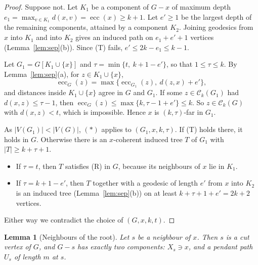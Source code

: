 \documentclass[11pt,a4paper]{article}
\newtheorem{lemma}[theorem]{Lemma}
\theoremstyle{definition}
\newcommand{\ecc}{\operatorname{ecc}}
\newcommand{\C}{\mathcal{C}}
\begin{document}
\begin{proof}
Suppose not. Let $K_1$ be a component of $G-x$ of maximum depth $e_1=\max_{v\in K_1}d(x,v)=\ecc(x)\ge k+1$. Let $e'\ge1$ be the largest depth of the remaining components, attained by a component $K_2$. Joining geodesics from $x$ into $K_1$ and into $K_2$ gives an induced path on $e_1+e'+1$ vertices (Lemma~\ref{lem:sep}(b)). Since (T) fails, $e'\le 2k-e_1\le k-1$.

Let $G_1=G[K_1\cup\{x\}]$ and $\tau=\min\{t,\ k+1-e'\}$, so that $1\le\tau\le k$. By Lemma~\ref{lem:sep}(a), for $z\in K_1\cup\{x\}$,
\[
\ecc_G(z)=\max\{\ecc_{G_1}(z),\ d(z,x)+e'\},
\]
and distances inside $K_1\cup\{x\}$ agree in $G$ and $G_1$. If some $z\in\C_k(G_1)$ had $d(x,z)\le\tau-1$, then $\ecc_G(z)\le\max\{k,\tau-1+e'\}\le k$. So $z\in\C_k(G)$ with $d(x,z)<t$, which is impossible. Hence $x$ is $(k,\tau)$-far in $G_1$.

As $|V(G_1)|<|V(G)|$, $(\ast)$ applies to $(G_1,x,k,\tau)$. If (T) holds there, it holds in $G$. Otherwise there is an $x$-coherent induced tree $T$ of $G_1$ with $|T|\ge k+\tau+1$.
\begin{itemize}
\item If $\tau=t$, then $T$ satisfies (R) in $G$, because its neighbours of $x$ lie in $K_1$.
\item If $\tau=k+1-e'$, then $T$ together with a geodesic of length $e'$ from $x$ into $K_2$ is an induced tree (Lemma~\ref{lem:sep}(b)) on at least $k+\tau+1+e'=2k+2$ vertices.
\end{itemize}
Either way we contradict the choice of $(G,x,k,t)$.
\end{proof}

\begin{lemma}[Neighbours of the root]\label{lem:nbrs}
Let $s$ be a neighbour of $x$. Then $s$ is a cut vertex of $G$, and $G-s$ has exactly two components: $X_s\ni x$, and a pendant path $U_s$ of length $m$ at $s$.
\end{lemma}
\end{document}

